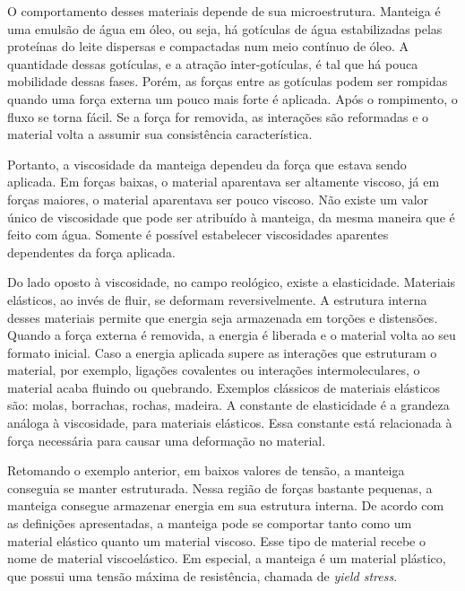 		O comportamento desses materiais depende de sua microestrutura. Manteiga é uma emulsão de água em óleo, ou seja, há gotículas de água estabilizadas pelas proteínas do leite dispersas e compactadas num meio contínuo de óleo. A quantidade dessas gotículas, e a atração inter-gotículas, é tal que há pouca mobilidade dessas fases.\cite{Hoffmann2014a} Porém, as forças entre as gotículas podem ser rompidas quando uma força externa um pouco mais forte é aplicada. Após o rompimento, o fluxo se torna fácil. Se a força for removida, as interações são reformadas e o material volta a assumir sua consistência característica.
		
		Portanto, a viscosidade da manteiga dependeu da força que estava sendo aplicada. Em forças baixas, o material aparentava ser altamente viscoso, já em forças maiores, o material aparentava ser pouco viscoso. Não existe um valor único de viscosidade que pode ser atribuído à manteiga, da mesma maneira que é feito com água. Somente é possível estabelecer viscosidades aparentes dependentes da força aplicada.\cite{Kronberg2014a}
		
		Do lado oposto à viscosidade, no campo reológico, existe a elasticidade.  Materiais elásticos, ao invés de fluir, se deformam reversivelmente. A estrutura interna desses materiais permite que energia seja armazenada em torções e distensões. Quando a força externa é removida, a energia é liberada e o material volta ao seu formato inicial. Caso a energia aplicada supere as interações que estruturam o material, por exemplo, ligações covalentes ou interações intermoleculares, o material acaba fluindo ou quebrando.\cite{Goodwin2008} Exemplos clássicos de materiais elásticos são: molas, borrachas, rochas, madeira. A constante de elasticidade é a grandeza análoga à viscosidade, para materiais elásticos. Essa constante está relacionada à força necessária para causar uma deformação no material. 

		Retomando o exemplo anterior, em baixos valores de tensão, a manteiga conseguia se manter estruturada. Nessa região de forças bastante pequenas, a manteiga consegue armazenar energia em sua estrutura interna. De acordo com as definições apresentadas, a manteiga pode se comportar tanto como um material elástico quanto um material viscoso. Esse tipo de material recebe o nome de material viscoelástico. Em especial, a manteiga é um material plástico, que possui uma tensão máxima de resistência, chamada de \emph{yield stress}.
		
